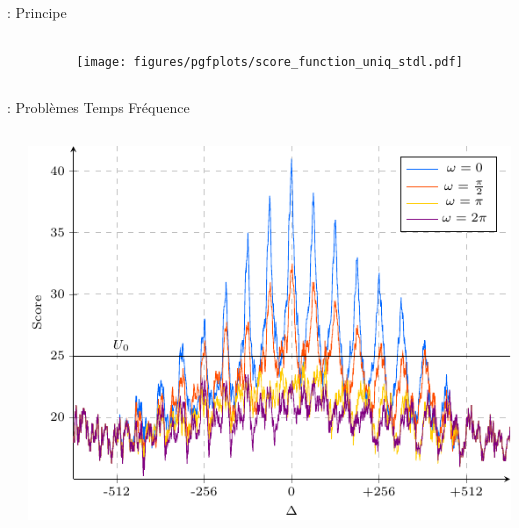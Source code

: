 \documentclass[../main.tex]{subfiles}
\begin{document}
\begin{frame}{\subsecname : {Principe}}
  \begin{columns}
    \begin{column}{.4\linewidth}

    \end{column}
    \begin{column}{.6\linewidth}
      \texttt{[image: figures/pgfplots/score\_function\_uniq\_stdl.pdf]}
    \end{column}
  \end{columns}
\end{frame}


\begin{frame}{\subsecname : {Problèmes Temps Fréquence}}
  \begin{columns}
    \begin{column}{.4\linewidth}

    \end{column}
    \begin{column}{.6\linewidth}
      \includegraphics[width=\linewidth, height=.75\textheight, keepaspectratio=true]{figures/pgfplots/score_function_stdl.pdf}
    \end{column}
  \end{columns}
\end{frame}
\end{document}
